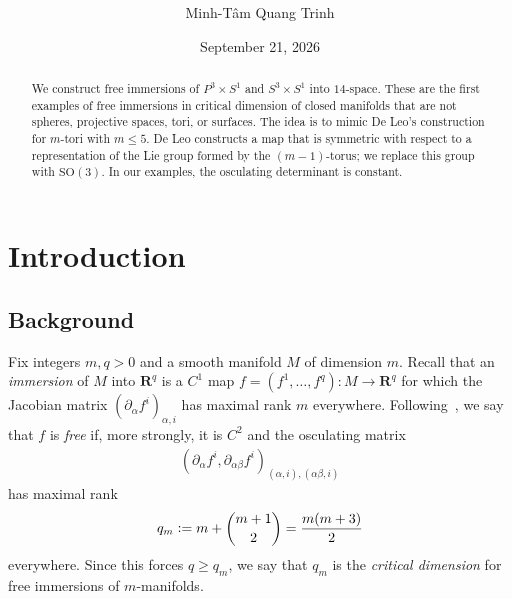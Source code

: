 \documentclass[a4paper,10pt,leqno]{article}
\title{\texorpdfstring{\vspace{-0.5in}\large\bfseries\mytitle}{\mytitle}}
\author{Minh-T\^{a}m Quang Trinh}
\affil{Department of Mathematics \\ Howard University\footnote{\url{minhtam.trinh@howard.edu}}}
\date{September 21, 2026}
\numberwithin{equation}{section}
\theoremstyle{plain}
\theoremstyle{definition}
\theoremstyle{remark}
\newcommand{\bb}{\mathbf}
\newcommand{\sapphire}[1]{\textcolor{sapphire}{#1}}
\newcommand{\dfemph}[1]{\sapphire{\emph{#1}}}
\begin{document}
\maketitle

\begin{abstract}
We construct free immersions of $P^3 \times S^1$ and $S^3 \times S^1$ into $14$-space.
These are the first examples of free immersions in critical dimension of closed manifolds that are not spheres, projective spaces, tori, or surfaces.
The idea is to mimic De Leo's construction for $m$-tori with $m \leq 5$.
De Leo constructs a map that is symmetric with respect to a representation of the Lie group formed by the $(m - 1)$-torus; we replace this group with $\mathrm{SO}(3)$.
In our examples, the osculating determinant is constant.
\end{abstract}

\thispagestyle{empty}



\setcounter{section}{-1}
\section{Introduction}

\subsection{Background}

Fix integers $m, q > 0$ and a smooth manifold $M$ of dimension $m$.
Recall that an \dfemph{immersion} of $M$ into $\bb{R}^q$ is a $C^1$ map $f = (f^1, \ldots, f^q) \colon M \to \bb{R}^q$ for which the Jacobian matrix $(\partial_\alpha f^i)_{\alpha, i}$ has maximal rank $m$ everywhere.
Following~\cite[\S{1.1.4}]{gromov}, we say that $f$ is \dfemph{free} if, more strongly, it is $C^2$ and the osculating matrix 
\begin{align} 
(\partial_\alpha f^i, \partial_{\alpha\beta} f^i)_{(\alpha, i), (\alpha\beta, i)}
\end{align} 
has maximal rank 
\begin{align}
q_m \vcentcolon= m + \binom{m + 1}{2} = \frac{m(m + 3)}{2}
\end{align}
everywhere.
Since this forces $q \geq q_m$, we say that $q_m$ is the \dfemph{critical dimension} for free immersions of $m$-manifolds.
\end{document}
